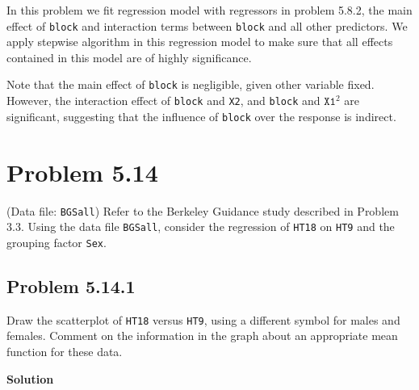 \documentclass[12pt,oneside,a4paper]{article}\usepackage[]{graphicx}\usepackage[]{xcolor}
\newcommand{\problem}[1]
{
    \clearpage
    \section*{Problem {#1}}
}
\newcommand{\subproblem}[1]
{
    \subsection*{Problem {#1}}
}
\newcommand{\solution}
{
    \vspace{15pt}
    \noindent\ignorespaces\textbf{\large Solution}
}
\newcommand{\m}[1]{\texttt{{#1}}}
\begin{document}
In this problem we fit regression model with regressors in problem 5.8.2, the main effect of \m{block} and interaction terms between \m{block} and all other predictors. We apply stepwise algorithm in this regression model to make sure that all effects contained in this model are of highly significance.

Note that the main effect of \m{block} is negligible, given other variable fixed. However, the interaction effect of \m{block} and \m{X2}, and \m{block} and $\m{X1}^2$ are significant, suggesting that the influence of \m{block} over the response is indirect.

\problem{5.14}
(Data file: \m{BGSall}) Refer to the Berkeley Guidance study described in Problem 3.3. Using the data file \m{BGSall}, consider the regression of \m{HT18} on \m{HT9} and the grouping factor \m{Sex}.

\subproblem{5.14.1}
Draw the scatterplot of \m{HT18} versus \m{HT9}, using a different symbol for males and females. Comment on the information in the graph about an appropriate mean function for these data.

\solution
\end{document}
